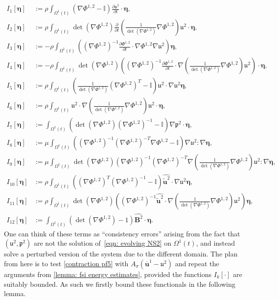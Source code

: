 \documentclass[a4paper]{amsart}
\numberwithin{equation}{section}
\newcommand{\ddt}[1]{\frac{\partial #1}{\partial t}}
\newcommand{\grad}{\nabla}
\theoremstyle{plain}
\newcommand{\mbf}[1]{\mathbf{#1}}
\newcommand{\mbb}[1]{\mathbb{#1}}
\newcommand{\utwo}{\boldsymbol{\mathfrak{u}}^2}
\newcommand{\ptwo}{\boldsymbol{\mathfrak{p}}^2}
\begin{document}
   \begin{align*}
       I_1[\boldsymbol{\eta}] &:= \rho \int_{\Omega^1(t)} (\grad \Phi^{1,2} - \mbb{I}) \ddt{\utwo} \cdot \boldsymbol{\eta},\\
       I_2[\boldsymbol{\eta}] &:= \rho \int_{\Omega^1(t)} \det(\grad \Phi^{1,2}) \ddt{}\left( \frac{1}{\det(\grad \Phi^{1,2})} \grad \Phi^{1,2}\right) \utwo \cdot \boldsymbol{\eta} ,\\
       I_3[\boldsymbol{\eta}] &:= - \rho\int_{\Omega^1(t)}\left((\grad \Phi^{1,2})^{-1}\ddt{\Phi^{1,2}} \cdot \grad \Phi^{1,2} \grad \utwo\right) \boldsymbol{\eta},\\
       I_4[\boldsymbol{\eta}] &:= - \rho\int_{\Omega^1(t)}\det(\grad \Phi^{1,2})\left((\grad \Phi^{1,2})^{-1}\ddt{\Phi^{1,2}} \cdot \grad \left( \frac{1}{\det(\grad \Phi^{1,2})} \grad \Phi^{1,2} \right) \utwo \right)\cdot \boldsymbol{\eta},\\
       I_5[\boldsymbol{\eta}] &:= \rho \int_{\Omega^1(t)} \left(\frac{1}{\det(\grad \Phi^{1,2})} (\grad \Phi^{1,2} )^T - \mbb{I}\right)\utwo \cdot \grad \utwo \boldsymbol{\eta} ,\\
       I_6[\boldsymbol{\eta}] &:= \rho \int_{\Omega^1(t)} \utwo \cdot \grad \left( \frac{1}{\det(\grad \Phi^{1,2})} \grad \Phi^{1,2} \right) \utwo \cdot \boldsymbol{\eta},\\
       I_7[\boldsymbol{\eta}] &:= \int_{\Omega^1(t)} \left( \det(\grad \Phi^{1,2})  (\grad \Phi^{1,2})^{-1} - \mbb{I} \right)\grad \ptwo \cdot \boldsymbol{\eta},\\
       I_8[\boldsymbol{\eta}] &:= \mu\int_{\Omega^1(t)} \left((\grad \Phi^{1,2})^{-1} (\grad \Phi^{1,2})^{-T} \grad \Phi^{1,2} - \mbb{I}\right) \grad \utwo : \grad \boldsymbol{\eta},\\
       I_9[\boldsymbol{\eta}] &:= \mu \int_{\Omega^1(t)} \det(\grad\Phi^{1,2}) (\grad \Phi^{1,2})^{-1} (\grad \Phi^{1,2})^{-T} \grad \left(\frac{1}{\det(\grad \Phi^{1,2})} \grad \Phi^{1,2} \right) \utwo : \grad \boldsymbol{\eta},\\
       I_{10}[\boldsymbol{\eta}] &:= \rho \int_{\Omega^1(t)} ((\grad \Phi^{1,2})^{T}(\grad \Phi^{1,2})^{-1}- \mbb{I})\widehat{\widetilde{\mbf{u}}^2} \cdot \grad \utwo \boldsymbol{\eta},\\
       I_{11}[\boldsymbol{\eta}] &:= \rho \int_{\Omega^1(t)} \det(\grad \Phi^{1,2}) \left((\grad \Phi^{1,2})^{-1} \widehat{\widetilde{\mbf{u}}^2} \cdot \grad \left(\frac{1}{\det(\grad \Phi^{1,2})} \grad \Phi^{1,2}\right) \utwo \right)\boldsymbol{\eta},\\
       I_{12}[\boldsymbol{\eta}] &:= \int_{\Omega^1(t)} (\det(\grad \Phi^{1,2}) - 1)\widehat{\mbf{B}^2} \cdot \boldsymbol{\eta}.
   \end{align*}
   One can think of these terms as ``consistency errors'' arising from the fact that $(\utwo, \ptwo)$ are not the solution of~\eqref{eqn: evolving NS2} on $\Omega^1(t)$, and instead solve a perturbed version of the system due to the different domain.
   The plan from here is to test \eqref{contraction pf5} with $A_{\sigma}(\overline{\mbf{u}}^1 - \utwo)$ and repeat the arguments from \eqref{lemma: fsi energy estimates}, provided the functions $I_k[\cdot]$ are suitably bounded.
   As such we firstly bound these functionals in the following lemma.
\end{document}
